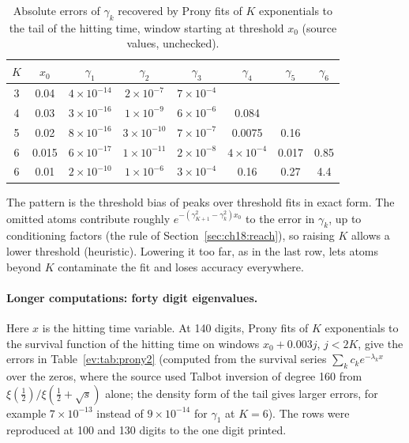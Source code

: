 \begin{table}[h]\centering\small
\begin{tabular}{cccccccc}
\toprule
$K$ & $x_0$ & $\gamma_1$ & $\gamma_2$ & $\gamma_3$ & $\gamma_4$ & $\gamma_5$ & $\gamma_6$\\
\midrule
3 & 0.04 & $4\times10^{-14}$ & $2\times10^{-7}$ & $7\times10^{-4}$ & & & \\
4 & 0.03 & $3\times10^{-16}$ & $1\times10^{-9}$ & $6\times10^{-6}$ & 0.084 & & \\
5 & 0.02 & $8\times10^{-16}$ & $3\times10^{-10}$ & $7\times10^{-7}$ & 0.0075 & 0.16 & \\
6 & 0.015 & $6\times10^{-17}$ & $1\times10^{-11}$ & $2\times10^{-8}$ & $4\times10^{-4}$ & 0.017 & 0.85\\
6 & 0.01 & $2\times10^{-10}$ & $1\times10^{-6}$ & $3\times10^{-4}$ & 0.16 & 0.27 & 4.4\\
\bottomrule
\end{tabular}
\caption{Absolute errors of $\gamma_k$ recovered by Prony fits of $K$ exponentials to the tail of the hitting time, window starting at threshold $x_0$ (source values, unchecked).}\label{ev:tab:prony}
\end{table}

The pattern is the threshold bias of peaks over threshold fits in exact form. The omitted atoms contribute roughly $e^{-(\gamma_{K+1}^2-\gamma_k^2)x_0}$ to the error in $\gamma_k$, up to conditioning factors (the rule of Section~\ref{sec:ch18:reach}), so raising $K$ allows a lower threshold (heuristic). Lowering it too far, as in the last row, lets atoms beyond $K$ contaminate the fit and loses accuracy everywhere.

\paragraph{Longer computations: forty digit eigenvalues.} Here $x$ is the hitting time variable. At 140 digits, Prony fits of $K$ exponentials to the survival function of the hitting time on windows $x_0+0.003j$, $j<2K$, give the errors in Table~\ref{ev:tab:prony2} (computed from the survival series $\sum_kc_ke^{-\lambda_kx}$ over the zeros, where the source used Talbot inversion of degree 160 from $\xi(\frac12)/\xi(\frac12+\sqrt s)$ alone; the density form of the tail gives larger errors, for example $7\times10^{-13}$ instead of $9\times10^{-14}$ for $\gamma_1$ at $K=6$). The rows were reproduced at 100 and 130 digits to the one digit printed.

